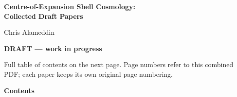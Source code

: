 \documentclass[11pt,a4paper]{article}
\begin{document}
\pagestyle{empty}
\begin{center}\vspace*{3cm}
{\LARGE\bfseries Centre-of-Expansion Shell Cosmology:\\[4pt] Collected Draft Papers\par}\vspace{1.5cm}
{\Large Chris Alameddin\par}\vspace{0.5cm}{\large October 2026\par}\vspace{0.8cm}
{\large\bfseries DRAFT --- work in progress\par}\vspace{2.5cm}\end{center}
\noindent\small Full table of contents on the next page. Page numbers refer to this combined PDF; each paper keeps its own original page numbering.
\clearpage
\thispagestyle{plain}
{\noindent\Large\bfseries Contents\par}\medskip
\end{document}
